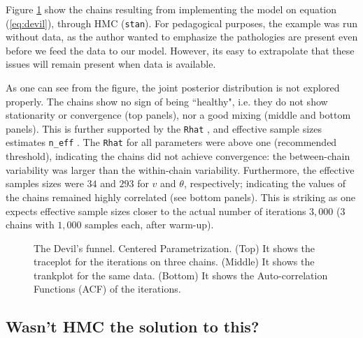 Figure \ref{fig:devil_CE} show the chains resulting from implementing the model on equation (\ref{eq:devil}), through HMC (\texttt{stan}). For pedagogical purposes, the example was run without data, as the author wanted to emphasize the pathologies are present even before we feed the data to our model. However, its easy to extrapolate that these issues will remain present when data is available.

As one can see from the figure, the joint posterior distribution is not explored properly. The chains show no sign of being ``healthy", i.e. they do not show stationarity or convergence (top panels), nor a good mixing (middle and bottom panels). This is further supported by the \texttt{Rhat} \cite{Gelman_et_al_2014}, and effective sample sizes estimates \texttt{n\_eff} \cite{Gelman_et_al_2014}. The \texttt{Rhat} for all parameters were above one (recommended threshold), indicating the chains did not achieve convergence: the between-chain variability was larger than the within-chain variability. Furthermore, the effective samples sizes were $34$ and $293$ for $v$ and $\theta$, respectively; indicating the values of the chains remained highly correlated (see bottom panels). This is striking as one expects effective sample sizes closer to the actual number of iterations $3,000$ ($3$ chains with $1,000$ samples each, after warm-up).
%
\begin{figure}[h]
	\centering
	\begin{subfigure}
		\texttt{[image: 1\_trace\_CE\_simple]}
	\end{subfigure}
	\begin{subfigure}
		\texttt{[image: 1\_trank\_CE\_simple]}
	\end{subfigure}
	\begin{subfigure}
		\texttt{[image: 1\_acf\_CE\_simple]}
	\end{subfigure}
	\caption[The Devil's funnel. Centered Parametrization. Stan.]%
	{The Devil's funnel. Centered Parametrization. (Top) It shows the traceplot for the iterations on three chains. (Middle) It shows the trankplot for the same data. (Bottom) It shows the Auto-correlation Functions (ACF) of the iterations.}
	\label{fig:devil_CE}
\end{figure}


\subsection{Wasn't HMC the solution to this?}


